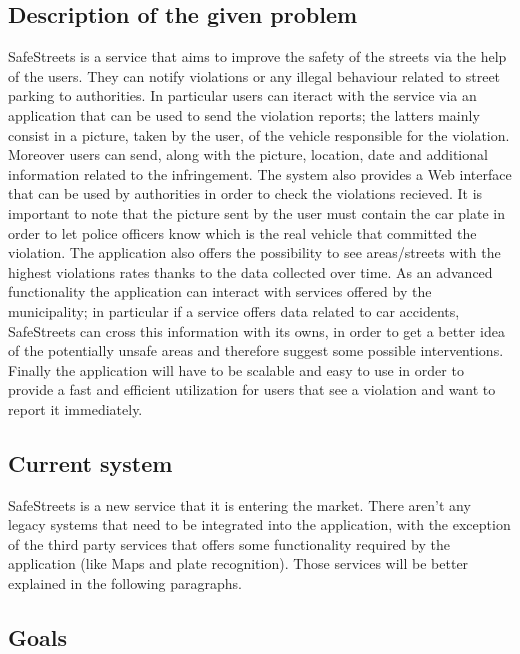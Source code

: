 \subsection{Description of the given problem}
SafeStreets is a service that aims to improve the safety of the streets via the help of the users. They can notify violations or any illegal behaviour related to street parking to authorities. In particular users can iteract with the service via an application that can be used to send the violation reports; the latters mainly consist in a picture, taken by the user, of the vehicle responsible for the violation. Moreover users can send, along with the picture, location, date and additional information related to the infringement. The system also provides a Web interface that can be used by authorities in order to check the violations recieved. It is important to note that the picture sent by the user must contain the car plate in order to let police officers know which is the real vehicle that committed the violation. The application also offers the possibility to see areas/streets with the highest violations rates thanks to the data collected over time. As an advanced functionality the application can interact with services offered by the municipality; in particular if a service offers data related to car accidents, SafeStreets can cross this information with its owns, in order to get a better idea of the potentially unsafe areas and therefore suggest some possible interventions. Finally the application will have to be scalable and easy to use in order to provide a fast and efficient utilization for users that see a violation and want to report it immediately.

\subsection{Current system}
SafeStreets is a new service that it is entering the market. There aren't any legacy systems that need to be integrated into the application, with the exception of the third party services that offers some functionality required by the application (like Maps and plate recognition). Those services will be better explained in the following paragraphs.


\subsection{Goals}

